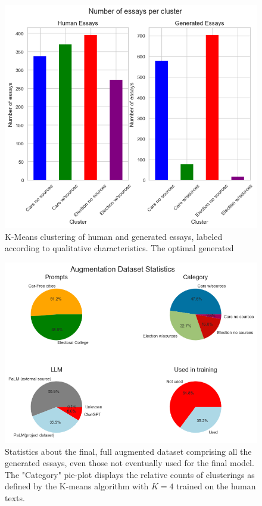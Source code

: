 \documentclass[11pt, a4paper]{article}
\begin{document}
	\begin{figure}
		\includegraphics[width=14cm]{clusters.png}
		\centering
		\caption{K-Means clustering of human and generated essays, labeled according to qualitative characteristics. The optimal generated }
		\label{fig::clusters}
	\end{figure}
	
	\begin{figure}
		\includegraphics[width=14cm]{augmentation_stats.png}
		\centering
		\caption{Statistics about the final, full augmented dataset comprising all the generated essays, even those not eventually used for the final model. The "Category" pie-plot displays the relative counts of clusterings as defined by the K-means algorithm with $K=4$ trained on the human texts.}
		\label{fig::augmentation_stats}
	\end{figure}
\end{document}
